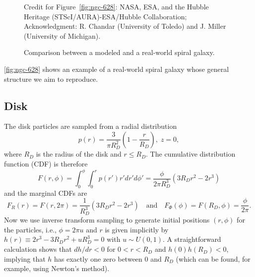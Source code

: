 \begin{figure}[htp]
    \vspace{0.5em}
    {\footnotesize
        Credit for Figure~\ref{fig:ngc-628}: NASA, ESA, and the Hubble Heritage (STScI/AURA)-ESA/Hubble Collaboration;
        Acknowledgment: R. Chandar (University of Toledo) and J. Miller (University of Michigan). \par}

    \caption{Comparison between a modeled and a real-world spiral galaxy.}
    \label{fig:galaxy-comparison}
\end{figure}
\autoref{fig:ngc-628} shows an example of a real-world spiral galaxy whose general structure we aim to reproduce.

\subsection{Disk}\label{subsec:disk}
The disk particles are sampled from a radial distribution
\begin{equation*}
    p(r) = \frac{3}{\pi R_D^2}\left(1 - \frac{r}{R_D}\right), \; z = 0,
\end{equation*}
where $R_D$ is the radius of the disk and $r \leq R_D$.
The cumulative distribution function (CDF) is therefore
\begin{equation*}
    F(r, \phi) = \int_{0}^{\phi}\int_{0}^{r} p(r') r'dr'd\phi' = \frac{\phi}{2\pi R_D^3}(3R_D r^2-2r^3)
\end{equation*}
and the marginal CDFs are
\begin{equation*}
    F_R(r) = F(r, 2\pi) = \frac{1}{R_D^3}(3R_D r^2-2r^3) \quad \text{and} \quad F_\Phi(\phi) = F(R_D, \phi) = \frac{\phi}{2\pi}.
\end{equation*}
Now we use inverse transform sampling to generate initial positions $(r, \phi)$ for the particles, i.e., $\phi = 2\pi u$ and $r$ is given implicitly by $h(r) \equiv 2r^3 - 3R_D r^2 + uR_D^3 = 0$ with $u \sim U(0, 1)$.
A straightforward calculation shows that $dh/dr < 0$ for $0 < r < R_D$ and $h(0)h(R_D) < 0$, implying that $h$ has exactly one zero between 0 and $R_D$ (which can be found, for example, using Newton's method).

